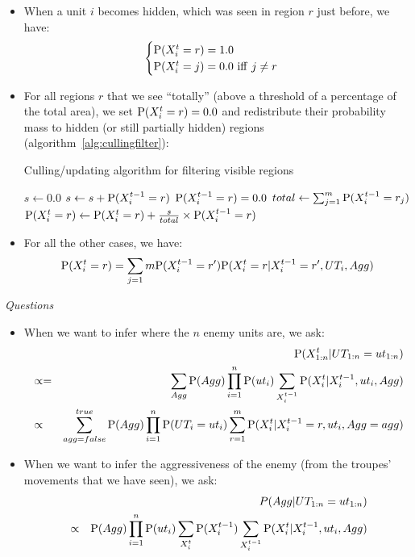 \begin{itemize}
    \item When a unit $i$ becomes hidden, which was seen in region $r$ just before, we have:
\begin{eqnarray*}
\begin{cases}
\mathrm{P}(X^t_{i} = r) = 1.0\\
\mathrm{P}(X^t_{i} = j) = 0.0\ \mathrm{iff}\ j \neq r
\end{cases}
\end{eqnarray*}

    \item For all regions $r$ that we see ``totally'' (above a threshold of a percentage of the total area), we set $\mathrm{P}(X^t_i = r) = 0.0$ and redistribute their probability mass to hidden (or still partially hidden) regions (algorithm~\ref{alg:cullingfilter}):
\begin{algorithm}[!h]
\caption{Culling/updating algorithm for filtering visible regions}
\label{alg:cullingfilter}
\begin{algorithmic}
    \State $s \leftarrow 0.0$
        \State $s \leftarrow s + \mathrm{P}(X^{t-1}_i = r)$
        \State $\mathrm{P}(X^{t-1}_i = r) = 0.0$
    \EndFor
    \State $total \leftarrow \sum_{j=1}^m \mathrm{P}(X^{t-1}_i=r_j)$
        \State $\mathrm{P}(X^t_i = r) \leftarrow \mathrm{P}(X^t_i = r) + \frac{s}{total}\times \mathrm{P}(X^{t-1}_i = r)$
    \EndFor
\EndFor
\end{algorithmic}
\end{algorithm}

    \item For all the other cases, we have:
$$\mathrm{P}(X^t_{i} = r) = \sum_{j=1}{m} \mathrm{P}(X^{t-1}_i = r')\mathrm{P}(X^t_i = r | X^{t-1}_i = r', UT_i, Agg)$$
\end{itemize}

\vspace{0.3cm}
\textit{Questions}\\

\begin{itemize}
    \item When we want to infer where the $n$ enemy units are, we ask:
\begin{eqnarray*}
& & \mathrm{P}(X_{1:n}^t| UT_{1:n}=ut_{1:n})\\
& \propto= & \sum_{Agg} \mathrm{P}(Agg) \prod_{i=1}^n \mathrm{P}(ut_i) \sum_{X_i^{t-1}} \mathrm{P}(X_i^t|X_i^{t-1},ut_i,Agg)\\
& \propto & \sum_{agg=false}^{true} \mathrm{P}(Agg) \prod_{i=1}^n \mathrm{P}(UT_i=ut_i) \sum_{r = 1}^{m} \mathrm{P}(X_i^t|X_i^{t-1}=r,ut_i,Agg=agg)
\end{eqnarray*}
    \item When we want to infer the aggressiveness of the enemy (from the troupes' movements that we have seen), we ask:
\begin{eqnarray*}
& & P(Agg | UT_{1:n} = ut_{1:n})\\
& \propto & \mathrm{P}(Agg) \prod_{i=1}^{n} \mathrm{P}(ut_i)\sum_{X_i^t}\mathrm{P}(X_i^{t-1}) \sum_{X_i^{t-1}}  \mathrm{P}(X_i^t|X_i^{t-1},ut_i,Agg) 
\end{eqnarray*}
\end{itemize}


